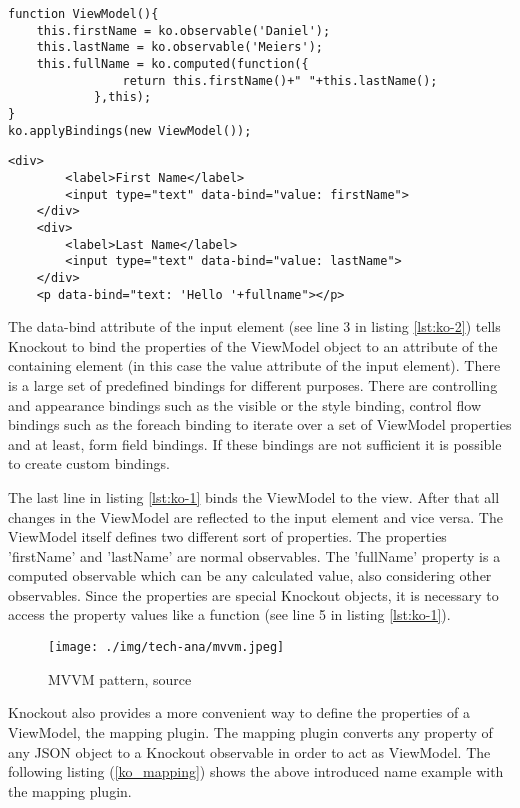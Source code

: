 \begin{lstlisting}[label=lst:ko-1,caption=the ViewModel]
function ViewModel(){
	this.firstName = ko.observable('Daniel');
	this.lastName = ko.observable('Meiers');
	this.fullName = ko.computed(function({
				return this.firstName()+" "+this.lastName();
			},this); 
}
ko.applyBindings(new ViewModel());
\end{lstlisting}

\begin{lstlisting}[label=lst:ko-2,caption=the html view]
 	<div>
		<label>First Name</label> 
		<input type="text" data-bind="value: firstName">
	</div>
	<div>
		<label>Last Name</label> 
		<input type="text" data-bind="value: lastName">
	</div>
	<p data-bind="text: 'Hello '+fullname"></p>
\end{lstlisting}

The data-bind attribute of the input element (see line 3 in listing \ref{lst:ko-2}) tells Knockout to bind the properties of the ViewModel object to an attribute of the containing element (in this case the value attribute of the input element).
There is a large set of predefined bindings for different purposes.
There  are controlling and appearance bindings such as the visible or the style binding, control flow bindings such as the foreach binding to iterate over a set of ViewModel properties and at least, form field bindings.
If these bindings are not sufficient it is possible to create custom bindings.


The last line in listing \ref{lst:ko-1} binds the ViewModel to the view.
After that all changes in the ViewModel are reflected to the input element and vice versa.
The ViewModel itself defines two different sort of properties.
The properties 'firstName' and 'lastName' are normal observables.
The 'fullName' property is a computed observable which can be any calculated value, also considering other observables.
Since the properties are special Knockout objects, it is necessary to access the property values like a function (see line 5 in listing \ref{lst:ko-1}).

\begin{figure}[h]
	\centering	
	\texttt{[image: ./img/tech-ana/mvvm.jpeg]}
	\caption{MVVM pattern, source \autocite{heise_knockout}}
	\label{fig:mvvm}
\end{figure}

Knockout also provides a more convenient way to define the properties of a ViewModel, the mapping plugin.
The mapping plugin converts any property of any JSON object to a Knockout observable in order to act as ViewModel.
The following listing (\ref{ko_mapping}) shows the above introduced name example with the mapping plugin.


